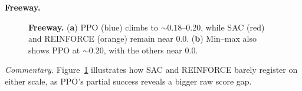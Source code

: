 \noindent \textbf{Freeway.}
\begin{figure} 
	\centering
	\quad
	\caption{\textbf{Freeway.}
		(\textbf{a}) PPO (blue) climbs to \(\sim0.18\)--0.20, while SAC (red) and REINFORCE (orange) remain near 0.0.
		(\textbf{b}) Min--max also shows PPO at \(\sim0.20\), with the others near 0.0.}
	\label{fig:freeway_combined}
\end{figure}

\noindent
\emph{Commentary.} Figure~\ref{fig:freeway_combined} illustrates how SAC and REINFORCE barely register on either scale, as PPO’s partial success reveals a bigger raw score gap.

\medskip


